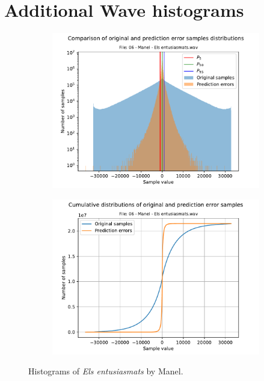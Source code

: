 \chapter{Additional Wave histograms} \label{ch:wave_hists}
\begin{figure}[h!]
	\centering
	\begin{subfigure}{0.45\textwidth}
		\centering
		\includegraphics[width=\linewidth]{images/wave_hists/06 - Manel - Els entusiasmats.wav_hist.pdf}
	\end{subfigure}%
	\begin{subfigure}{0.45\textwidth}
		\centering
		\includegraphics[width=\linewidth]{images/wave_hists/06 - Manel - Els entusiasmats.wav_hist_cum.pdf}
	\end{subfigure}
	\caption{Histograms of \textit{Els entusiasmats} by Manel.}
	\label{fig:entusiasmats_manel}
\end{figure}

